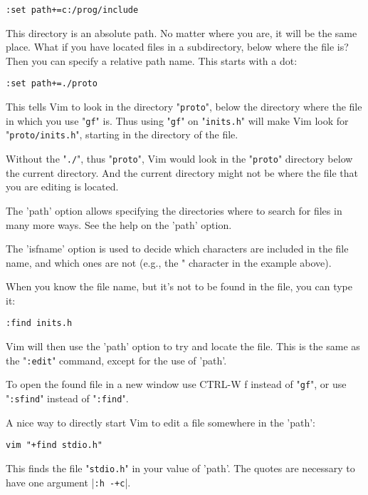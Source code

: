 \begin{Verbatim}[samepage=true]
 :set path+=c:/prog/include
\end{Verbatim}

This directory is an absolute path.
No matter where you are, it will be the same place.
What if you have located files in a subdirectory, below where the file is?  Then you can specify a relative path name.
This starts with a dot:

\begin{Verbatim}[samepage=true]
 :set path+=./proto
\end{Verbatim}

This tells Vim to look in the directory "\verb!proto!", below the directory where the file in which you use "\verb!gf!" is.
Thus using "\verb!gf!" on "\verb!inits.h!" will make Vim look for "\verb!proto/inits.h!", starting in the directory of the file.

Without the "\verb!./!", thus "\verb!proto!", Vim would look in the "\verb!proto!" directory below the current directory.
And the current directory might not be where the file that you are editing is located.

The 'path' option allows specifying the directories where to search for files in many more ways.
See the help on the 'path' option.

The 'isfname' option is used to decide which characters are included in the file name, and which ones are not (e.g., the " character in the example above).

When you know the file name, but it's not to be found in the file, you can type it:

\begin{Verbatim}[samepage=true]
 :find inits.h
\end{Verbatim}

Vim will then use the 'path' option to try and locate the file.
This is the same as the "\verb!:edit!" command, except for the use of 'path'.

To open the found file in a new window use CTRL-W f instead of "\verb!gf!", or use "\verb!:sfind!" instead of "\verb!:find!".

A nice way to directly start Vim to edit a file somewhere in the 'path':

\begin{Verbatim}[samepage=true]
 vim "+find stdio.h"
\end{Verbatim}

This finds the file "\verb!stdio.h!" in your value of 'path'.
The quotes are necessary to have one argument |\verb!:h -+c!|.
